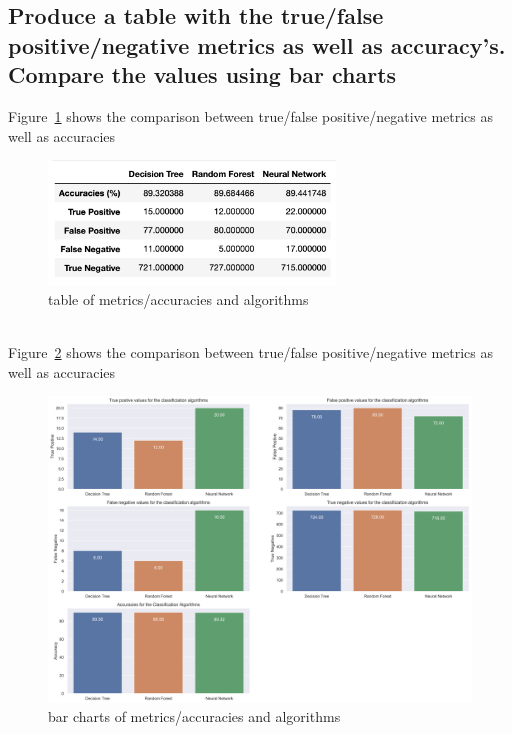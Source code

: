 \newpage
\subsection{Produce a table with the true/false positive/negative metrics as well as accuracy's. Compare the values using bar charts}

Figure~\ref{fig:fig4} shows the comparison between true/false positive/negative metrics as well as accuracies
\begin{figure}[!ht]
 \centering
\includegraphics[width=3.0in]{assignment2/1-5_table.png}
\caption{\label{fig:fig4}table of metrics/accuracies and algorithms}
\end{figure}
\\
Figure~\ref{fig:fig5} shows the comparison between true/false positive/negative metrics as well as accuracies
\begin{figure}[!ht]
 \centering
\includegraphics[width=5.1in]{assignment2/barcharts_algorithms.png}
\caption{\label{fig:fig5}bar charts of metrics/accuracies and algorithms}
\end{figure}

\\


\newpage
